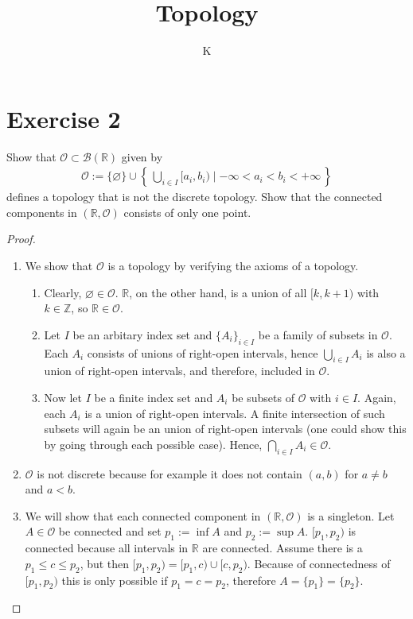 \documentclass[a4paper]{article}
\title{Topology}
\author{K}
\newcommand{\makeset}[2]{\left\{\, #1 \mid #2 \,\right\}}
\begin{document}
\section*{Exercise 2}
    Show that \(\mathcal{O} \subset \mathcal{B}(\mathbb{R})\) given by
    \begin{align}
        \mathcal{O} := \{\varnothing\} \cup \makeset{\bigcup_{i \in I}[a_i, b_i)}{-\infty < a_i < b_i < +\infty}
    \end{align}
    defines a topology that is not the discrete topology. Show that the connected components in \((\mathbb{R}, \mathcal{O})\) consists of only one point.

    \begin{proof}
        \begin{enumerate}
            \item We show that \(\mathcal{O}\) is a topology by verifying the axioms of a topology.
            \begin{enumerate}
                \item Clearly, \(\varnothing \in \mathcal{O}\). \(\mathbb{R}\), on the other hand, is a union of all \([k, k + 1)\) with \(k \in \mathbb{Z}\), so \(\mathbb{R} \in \mathcal{O}\).
                \item Let \(I\) be an arbitary index set and \(\{A_i\}_{i \in I}\) be a family of subsets in \(\mathcal{O}\). Each \(A_i\) consists of unions of right-open intervals, hence \(\bigcup_{i \in I}A_i\) is also a union of right-open intervals, and therefore, included in \(\mathcal{O}\).
                \item Now let \(I\) be a finite index set and \(A_i\) be subsets of \(\mathcal{O}\) with \(i \in I\). Again, each \(A_i\) is a union of right-open intervals. A finite intersection of such subsets will again be an union of right-open intervals (one could show this by going through each possible case). Hence, \(\bigcap_{i\in I}A_i \in \mathcal{O}\).
            \end{enumerate}
            \item \(\mathcal{O}\) is not discrete because for example it does not contain \((a, b)\) for \(a \neq b\) and \(a < b\).
            \item We will show that each connected component in \((\mathbb{R}, \mathcal{O})\) is a singleton. Let \(A \in \mathcal{O}\) be connected and set \(p_1 := \inf A\) and \(p_2 := \sup A\). \([p_1, p_2)\) is connected because all intervals in \(\mathbb{R}\) are connected. Assume there is a \(p_1 \leq c \leq p_2\), but then \([p_1, p_2) = [p_1, c) \cup [c, p_2)\). Because of connectedness of \([p_1, p_2)\) this is only possible if \(p_1 = c = p_2\), therefore \(A = \{p_1\} = \{p_2\}\).
        \end{enumerate}
    \end{proof}
\end{document}
